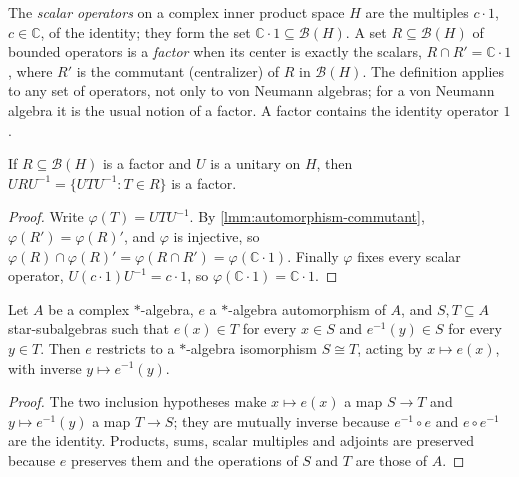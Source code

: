 \begin{definition}
    \label{def:factor}
    \leanok
    The \emph{scalar operators} on a complex inner product space $H$ are the multiples $c \cdot 1$, $c \in \mathbb{C}$, of the identity; they form the set $\mathbb{C}\cdot 1 \subseteq \mathcal{B}(H)$. A set $R \subseteq \mathcal{B}(H)$ of bounded operators is a \emph{factor} when its center is exactly the scalars, $R \cap R' = \mathbb{C}\cdot 1$, where $R'$ is the commutant (centralizer) of $R$ in $\mathcal{B}(H)$. The definition applies to any set of operators, not only to von Neumann algebras; for a von Neumann algebra it is the usual notion of a factor. A factor contains the identity operator $1$.
\end{definition}

\begin{lemma}
    \label{lmm:factor-conj}
    \leanok
    If $R \subseteq \mathcal{B}(H)$ is a factor and $U$ is a unitary on $H$, then $U R U^{-1} = \{U T U^{-1} : T \in R\}$ is a factor.
\end{lemma}
\begin{proof}
    \leanok
    Write $\varphi(T) = U T U^{-1}$. By \ref{lmm:automorphism-commutant}, $\varphi(R') = \varphi(R)'$, and $\varphi$ is injective, so $\varphi(R) \cap \varphi(R)' = \varphi(R \cap R') = \varphi(\mathbb{C}\cdot 1)$. Finally $\varphi$ fixes every scalar operator, $U (c \cdot 1) U^{-1} = c \cdot 1$, so $\varphi(\mathbb{C}\cdot 1) = \mathbb{C}\cdot 1$.
\end{proof}

\begin{lemma}
    \label{lmm:restrict-star-alg-equiv}
    \leanok
    Let $A$ be a complex $*$-algebra, $e$ a $*$-algebra automorphism of $A$, and $S, T \subseteq A$ star-subalgebras such that $e(x) \in T$ for every $x \in S$ and $e^{-1}(y) \in S$ for every $y \in T$. Then $e$ restricts to a $*$-algebra isomorphism $S \cong T$, acting by $x \mapsto e(x)$, with inverse $y \mapsto e^{-1}(y)$.
\end{lemma}
\begin{proof}
    \leanok
    The two inclusion hypotheses make $x \mapsto e(x)$ a map $S \to T$ and $y \mapsto e^{-1}(y)$ a map $T \to S$; they are mutually inverse because $e^{-1} \circ e$ and $e \circ e^{-1}$ are the identity. Products, sums, scalar multiples and adjoints are preserved because $e$ preserves them and the operations of $S$ and $T$ are those of $A$.
\end{proof}

